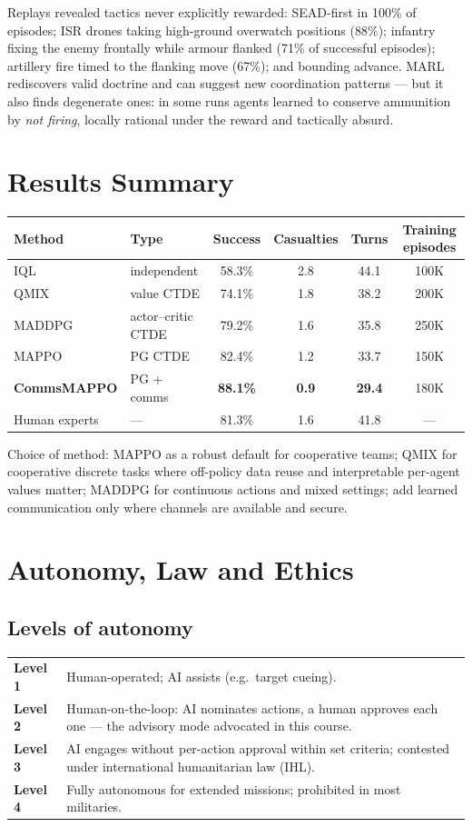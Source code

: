 \documentclass[11pt]{article}
\begin{document}
Replays revealed tactics never explicitly rewarded: SEAD-first in 100\% of episodes; ISR drones taking high-ground overwatch positions (88\%); infantry fixing the enemy frontally while armour flanked (71\% of successful episodes); artillery fire timed to the flanking move (67\%); and bounding advance. MARL rediscovers valid doctrine and can suggest new coordination patterns --- but it also finds degenerate ones: in some runs agents learned to conserve ammunition by \emph{not firing}, locally rational under the reward and tactically absurd.

\section{Results Summary}
\begin{center}\small\renewcommand{\arraystretch}{1.2}
\begin{tabular}{llcccc}\toprule Method & Type & Success & Casualties & Turns & Training episodes\\\midrule IQL & independent & 58.3\% & 2.8 & 44.1 & 100K\\ QMIX & value CTDE & 74.1\% & 1.8 & 38.2 & 200K\\ MADDPG & actor--critic CTDE & 79.2\% & 1.6 & 35.8 & 250K\\ MAPPO & PG CTDE & 82.4\% & 1.2 & 33.7 & 150K\\ \textbf{CommsMAPPO} & PG + comms & \textbf{88.1\%} & \textbf{0.9} & \textbf{29.4} & 180K\\ Human experts & --- & 81.3\% & 1.6 & 41.8 & ---\\\bottomrule\end{tabular}\end{center}
Choice of method: MAPPO as a robust default for cooperative teams; QMIX for cooperative discrete tasks where off-policy data reuse and interpretable per-agent values matter; MADDPG for continuous actions and mixed settings; add learned communication only where channels are available and secure.

\section{Autonomy, Law and Ethics}
\subsection{Levels of autonomy}
\begin{center}\small\renewcommand{\arraystretch}{1.25}
\begin{tabularx}{\textwidth}{>{\bfseries}lX}\toprule Level 1 & Human-operated; AI assists (e.g.\ target cueing).\\ Level 2 & Human-on-the-loop: AI nominates actions, a human approves each one --- the advisory mode advocated in this course.\\ Level 3 & AI engages without per-action approval within set criteria; contested under international humanitarian law (IHL).\\ Level 4 & Fully autonomous for extended missions; prohibited in most militaries.\\\bottomrule\end{tabularx}\end{center}
\end{document}
